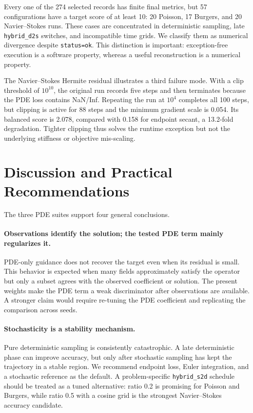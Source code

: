 \documentclass[twoside,11pt]{article}
\newcommand{\hsd}{\texttt{hybrid\_s2d}}
\newcommand{\hds}{\texttt{hybrid\_d2s}}
\begin{document}
Every one of the 274 selected records has finite final metrics, but 57
configurations have a target score of at least 10: 20 Poisson, 17 Burgers,
and 20 Navier--Stokes runs.  These cases are concentrated in deterministic
sampling, late \hds{} switches, and incompatible time grids.  We classify
them as numerical divergence despite \texttt{status=ok}.  This distinction is
important: exception-free execution is a software property, whereas a useful
reconstruction is a numerical property.

The Navier--Stokes Hermite residual illustrates a third failure mode.  With a
clip threshold of \(10^{10}\), the original run records five steps and
then terminates because the PDE loss contains NaN/Inf.  Repeating the run at
\(10^4\) completes all 100 steps, but clipping is active for 88 steps and the
minimum gradient scale is 0.054.  Its balanced score is 2.078, compared with
0.158 for endpoint secant, a 13.2-fold degradation.  Tighter clipping thus
solves the runtime exception but not the underlying stiffness or objective
mis-scaling.

\section{Discussion and Practical Recommendations}
\label{sec:discussion}

The three PDE suites support four general conclusions.

\paragraph{Observations identify the solution; the tested PDE term mainly
regularizes it.}
PDE-only guidance does not recover the target even when its residual is small.
This behavior is expected when many fields approximately satisfy the operator
but only a subset agrees with the observed coefficient or solution.  The
present weights make the PDE term a weak discriminator after observations are
available.  A stronger claim would require re-tuning the PDE coefficient and
replicating the comparison across seeds.

\paragraph{Stochasticity is a stability mechanism.}
Pure deterministic sampling is consistently catastrophic.  A late
deterministic phase can improve accuracy, but only after stochastic sampling
has kept the trajectory in a stable region.  We recommend endpoint loss,
Euler integration, and a stochastic reference as the default.  A
problem-specific \hsd{} schedule should be treated as a tuned alternative:
ratio 0.2 is promising for Poisson and Burgers, while ratio 0.5 with a cosine
grid is the strongest Navier--Stokes accuracy candidate.
\end{document}
